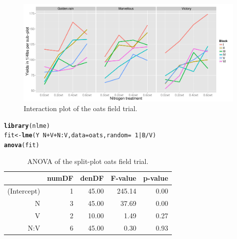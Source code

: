 \documentclass[12pt]{article}\usepackage[]{graphicx}\usepackage[]{color}
\makeatletter
\def\maxwidth{ %
  \ifdim\Gin@nat@width>\linewidth
    \linewidth
  \else
    \Gin@nat@width
  \fi
}
\newcommand{\hlnum}[1]{\textcolor[rgb]{0.686,0.059,0.569}{#1}}%
\newcommand{\hlopt}[1]{\textcolor[rgb]{0,0,0}{#1}}%
\newcommand{\hlstd}[1]{\textcolor[rgb]{0.345,0.345,0.345}{#1}}%
\newcommand{\hlkwb}[1]{\textcolor[rgb]{0.69,0.353,0.396}{#1}}%
\newcommand{\hlkwc}[1]{\textcolor[rgb]{0.333,0.667,0.333}{#1}}%
\newcommand{\hlkwd}[1]{\textcolor[rgb]{0.737,0.353,0.396}{\textbf{#1}}}%
\newenvironment{kframe}{%
 \def\at@end@of@kframe{}%
 \ifinner\ifhmode%
  \def\at@end@of@kframe{\end{minipage}}%
  \begin{minipage}{\columnwidth}%
 \fi\fi%
 \def\FrameCommand##1{\hskip\@totalleftmargin \hskip-\fboxsep
 \colorbox{shadecolor}{##1}\hskip-\fboxsep
     \hskip-\linewidth \hskip-\@totalleftmargin \hskip\columnwidth}%
 \MakeFramed {\advance\hsize-\width
   \@totalleftmargin\z@ \linewidth\hsize
   \@setminipage}}%
 {\par\unskip\endMakeFramed%
 \at@end@of@kframe}
\newenvironment{knitrout}{}{} %
\makeatother
\begin{document}
\begin{knitrout}
\color{fgcolor}\begin{figure}[]

\includegraphics[width=\maxwidth]{figure/chunk51_} \caption[Interaction plot of the oats field trial]{Interaction plot of the oats field trial.\label{fig:chunk51,}}
\end{figure}


\end{knitrout}


\begin{knitrout}
\color{fgcolor}\begin{kframe}
\begin{alltt}
\hlkwd{library}\hlstd{(nlme)}
\hlstd{fit} \hlkwb{<-} \hlkwd{lme}\hlstd{(Y} \hlopt{~} \hlstd{N} \hlopt{+} \hlstd{V} \hlopt{+} \hlstd{N}\hlopt{:}\hlstd{V,} \hlkwc{data} \hlstd{= oats,} \hlkwc{random} \hlstd{=} \hlopt{~}\hlnum{1} \hlopt{|} \hlstd{B}\hlopt{/}\hlstd{V)}
\hlkwd{anova}\hlstd{(fit)}
\end{alltt}
\end{kframe}
\end{knitrout}



\begin{table}[ht]
\centering
\begin{tabular}{rrrrr}
  \hline
 & numDF & denDF & F-value & p-value \\ 
  \hline
(Intercept) &   1 & 45.00 & 245.14 & 0.00 \\ 
  N &   3 & 45.00 & 37.69 & 0.00 \\ 
  V &   2 & 10.00 & 1.49 & 0.27 \\ 
  N:V &   6 & 45.00 & 0.30 & 0.93 \\ 
   \hline
\end{tabular}
\caption{ANOVA of the split-plot oats field trial.} 
\end{table}
\end{document}
